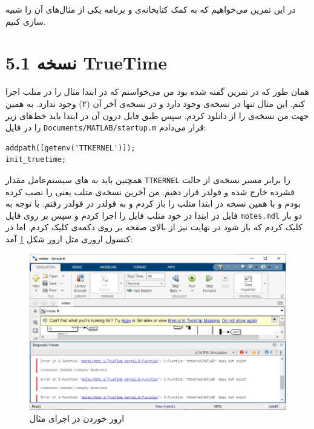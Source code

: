 \documentclass[]{article}
\begin{document}
\printheader

در این تمرین می‌خواهیم که به کمک کتابخانه‌ی
 و برنامه 
یکی از مثال‌های آن را شبیه سازی کنیم.

\section*{نسخه 5.1 TrueTime}
همان طور که در تمرین گفته شده بود من می‌خواستم که در ابتدا مثال
را در متلب اجرا کنم. این مثال تنها در نسخه‌ی
وجود دارد و در نسخه‌ی آخر آن (۲) وجود ندارد.
به همین جهت من نسخه‌ی
را از
دانلود کردم. سپس طبق فایل
درون آن در ابتدا باید خط‌های زیر را در فایل
\verb|Documents/MATLAB/startup.m|
قرار می‌دادم:
\begin{latin}
\begin{lstlisting}
addpath([getenv('TTKERNEL')]);
init_truetime;
\end{lstlisting}
\end{latin}
همچنین باید به
های
سیستم‌عامل مقدار
\verb|TTKERNEL|
را برابر مسیر نسخه‌ی از حالت فشرده خارج شده و فولدر
قرار دهیم.
من آخرین نسخه‌ی متلب یعنی
را نصب کرده بودم و با همین نسخه در ابتدا متلب را باز کردم و به فولدر
در فولدر
رفتم. با توجه به فایل
در ابتدا در
خود متلب فایل
را اجرا کردم و سپس بر روی فایل
\verb|motes.mdl|
دو بار کلیک کردم که باز شود در نهایت نیز از بالای صفحه بر روی دکمه‌ی
کلیک کردم. اما در کنسول اروری مثل ارور شکل
\ref{fig:1.5-error-run}
آمد:
\begin{figure}[H]
    \centering
    \includegraphics[scale=0.6]{pics/1.5-error.jpg}
    \caption{ارور خوردن در اجرای مثال }
    \label{fig:1.5-error-run}
\end{figure}
\end{document}
